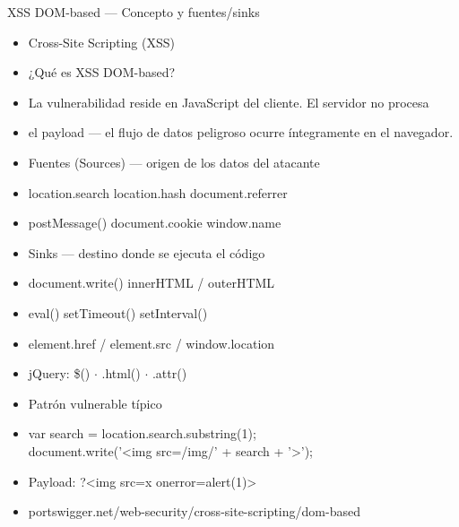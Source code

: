 \documentclass[aspectratio=169,10pt]{beamer}
\newcommand{\cmdbox}[1]{%
  \begin{center}%
  {\setlength{\fboxsep}{6pt}\colorbox{uzlav!40}{\parbox{0.88\linewidth}{\ttfamily\footnotesize #1}}}%
  \end{center}}
\begin{document}
\begin{frame}[allowframebreaks]{XSS DOM-based --- Concepto y fuentes/sinks}
\small
  \begin{itemize}
  \item Cross-Site Scripting (XSS)
  \item ¿Qué es XSS DOM-based?
  \item La vulnerabilidad reside en JavaScript del cliente. El servidor no procesa
  \item el payload --- el flujo de datos peligroso ocurre íntegramente en el navegador.
  \item Fuentes (Sources) --- origen de los datos del atacante
  \item location.search location.hash document.referrer
  \item postMessage() document.cookie window.name
  \item Sinks --- destino donde se ejecuta el código
  \item document.write() innerHTML / outerHTML
  \item eval() setTimeout() setInterval()
  \item element.href / element.src / window.location
  \item jQuery: \$() $\cdot$ .html() $\cdot$ .attr()
  \item Patrón vulnerable típico
  \item[] \cmdbox{var search = location.search.substring(1);\\{}
document.write('\textless{}img src=\textquotedbl{}/img/' + search + '\textquotedbl{}\textgreater{}');}
  \item Payload: ?\textless{}img src=x onerror=alert(1)\textgreater{}
  \item portswigger.net/web-security/cross-site-scripting/dom-based
  \end{itemize}
\end{frame}
\end{document}
